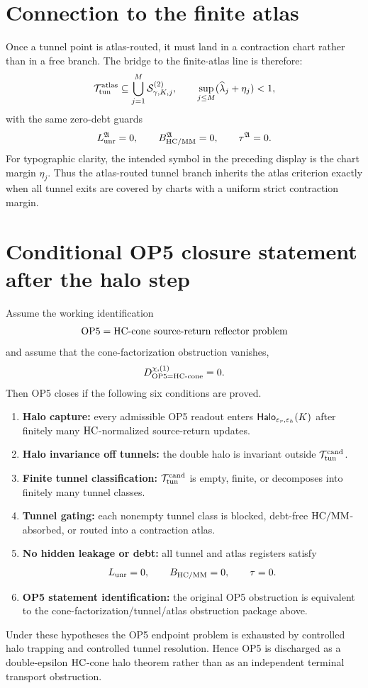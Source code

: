 \section{Connection to the finite atlas}

Once a tunnel point is atlas-routed, it must land in a contraction chart rather than in a free branch. The bridge to the finite-atlas line is therefore:
\[
\mathcal T_{\mathrm{tun}}^{\mathrm{atlas}}
\subseteq
\bigcup_{j=1}^{M}\mathcal S_{\gamma,K,j}^{(2)},
\qquad
\sup_{j\le M}(\widehat\lambda_j+\eta_j)<1,
\]
with the same zero-debt guards
\[
L_{\mathrm{unr}}^{\mathfrak A}=0,
\qquad
B_{\mathrm{HC}/\mathrm{MM}}^{\mathfrak A}=0,
\qquad
\tau^{\mathfrak A}=0.
\]
For typographic clarity, the intended symbol in the preceding display is the chart margin \(\eta_j\). Thus the atlas-routed tunnel branch inherits the atlas criterion exactly when all tunnel exits are covered by charts with a uniform strict contraction margin.

\section{Conditional OP5 closure statement after the halo step}

\begin{theorem}
Assume the working identification
\[
\mathrm{OP}5=\mathrm{HC}\text{-cone source-return reflector problem}
\]
and assume that the cone-factorization obstruction vanishes,
\[
D_{\mathrm{OP}5=\mathrm{HC}\text{-}\mathrm{cone}}^{\chi,(1)}=0.
\]
Then OP5 closes if the following six conditions are proved.
\begin{enumerate}
 \item \textbf{Halo capture:} every admissible OP5 readout enters \(\mathsf{Halo}_{\varepsilon_r,\varepsilon_h}(K)\) after finitely many \(\mathrm{HC}\)-normalized source-return updates.
 \item \textbf{Halo invariance off tunnels:} the double halo is invariant outside \(\mathcal T_{\mathrm{tun}}^{\mathrm{cand}}\).
 \item \textbf{Finite tunnel classification:} \(\mathcal T_{\mathrm{tun}}^{\mathrm{cand}}\) is empty, finite, or decomposes into finitely many tunnel classes.
 \item \textbf{Tunnel gating:} each nonempty tunnel class is blocked, debt-free \(\mathrm{HC}/\mathrm{MM}\)-absorbed, or routed into a contraction atlas.
 \item \textbf{No hidden leakage or debt:} all tunnel and atlas registers satisfy
 \[
 L_{\mathrm{unr}}=0,
 \qquad
 B_{\mathrm{HC}/\mathrm{MM}}=0,
 \qquad
 \tau=0.
 \]
 \item \textbf{OP5 statement identification:} the original OP5 obstruction is equivalent to the cone-factorization/tunnel/atlas obstruction package above.
\end{enumerate}
Under these hypotheses the OP5 endpoint problem is exhausted by controlled halo trapping and controlled tunnel resolution. Hence OP5 is discharged as a double-epsilon \(\mathrm{HC}\)-cone halo theorem rather than as an independent terminal transport obstruction.
\end{theorem}

